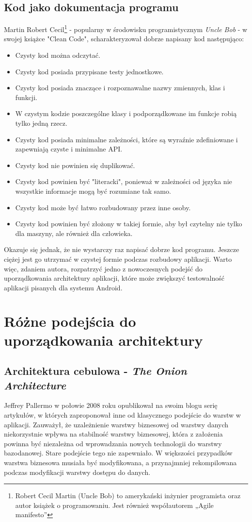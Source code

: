 \subsection{Kod jako dokumentacja programu}
\label{czysty_kod}
Martin Robert Cecil\footnote{Robert Cecil Martin (Uncle Bob) to amerykański inżynier programista oraz autor książek o programowaniu. Jest również współautorem „Agile manifesto”} - popularny w środowisku programistycznym \textit{Uncle Bob} - w swojej książce "Clean Code"\cite{bib:cecil:clean_code}, scharakteryzował dobrze napisany kod następująco: 
\begin{itemize}
\item
Czysty kod można odczytać.
\item
Czysty kod posiada przypisane testy jednostkowe.
\item
Czysty kod posiada znaczące i rozpoznawalne nazwy zmiennych, klas i funkcji.
\item
W czystym kodzie poszczególne klasy i podporządkowane im funkcje robią tylko jedną rzecz.
\item
Czysty kod posiada minimalne zależności, które są wyraźnie zdefiniowane i zapewniają czyste i minimalne API.
\item
Czysty kod nie powinien się duplikować.
\item
Czysty kod powinien być "literacki", ponieważ w zależności od języka nie wszystkie informacje mogą być rozumiane tak samo.
\item
Czysty kod może być łatwo rozbudowany przez inne osoby.
\item
Czysty kod powinien być złożony w takiej formie, aby był czytelny nie tylko dla maszyny, ale również dla człowieka.
\end{itemize}
Okazuje się jednak, że nie wystarczy raz napisać dobrze kod programu. Jeszcze ciężej jest go utrzymać w czystej formie podczas rozbudowy aplikacji. Warto więc, zdaniem autora, rozpatrzyć jedno z nowoczesnych podejść do uporządkowania architektury aplikacji, które może zwiększyć testowalność aplikacji pisanych dla systemu Android.

\section{Różne podejścia do uporządkowania architektury}
\subsection{Architektura cebulowa - \textit{The Onion Architecture}}
Jeffrey Pallermo w połowie 2008 roku opublikował na swoim blogu serię artykułów\cite{website:architect:onion}, w których zaproponował inne od klasycznego podejście do warstw w aplikacji. Zauważył, że uzależnienie warstwy biznesowej od warstwy danych niekorzystnie wpływa na stabilność warstwy biznesowej, która z założenia powinna być niezależna od wprowadzania nowych technologii do warstwy bazodanowej. Stare podejście tego nie zapewniało. W większości przypadków warstwa biznesowa musiała być modyfikowana, a przynajmniej rekompilowana podczas modyfikacji warstwy dostępu do danych.

